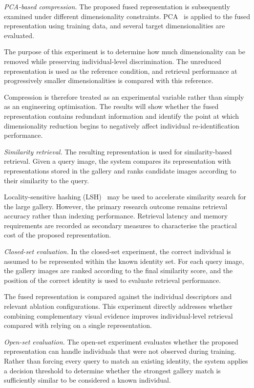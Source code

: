 \documentclass[runningheads]{llncs}
\begin{document}
\emph{PCA-based compression.}
The proposed fused representation is subsequently examined under different dimensionality
constraints. PCA~\cite{jolliffe2002pca} is applied to the fused representation using training data,
and several target dimensionalities are evaluated.

The purpose of this experiment is to determine how much dimensionality can be removed while
preserving individual-level discrimination. The unreduced representation is used as the reference
condition, and retrieval performance at progressively smaller dimensionalities is compared with this
reference.

Compression is therefore treated as an experimental variable rather than simply as an engineering
optimisation. The results will show whether the fused representation contains redundant information
and identify the point at which dimensionality reduction begins to negatively affect individual
re-identification performance.

\emph{Similarity retrieval.}
The resulting representation is used for similarity-based retrieval. Given a query image, the system
compares its representation with representations stored in the gallery and ranks candidate images
according to their similarity to the query.

Locality-sensitive hashing (LSH)~\cite{indyk1998lsh} may be used to accelerate similarity search for
the large gallery. However, the primary research outcome remains retrieval accuracy rather than
indexing performance. Retrieval latency and memory requirements are recorded as secondary measures
to characterise the practical cost of the proposed representation.

\emph{Closed-set evaluation.}
In the closed-set experiment, the correct individual is assumed to be represented within the known
identity set. For each query image, the gallery images are ranked according to the final similarity
score, and the position of the correct identity is used to evaluate retrieval performance.

The fused representation is compared against the individual descriptors and relevant ablation
configurations. This experiment directly addresses whether combining complementary visual evidence
improves individual-level retrieval compared with relying on a single representation.

\emph{Open-set evaluation.}
The open-set experiment evaluates whether the proposed representation can handle individuals that
were not observed during training. Rather than forcing every query to match an existing identity, the
system applies a decision threshold to determine whether the strongest gallery match is sufficiently
similar to be considered a known individual.
\end{document}
